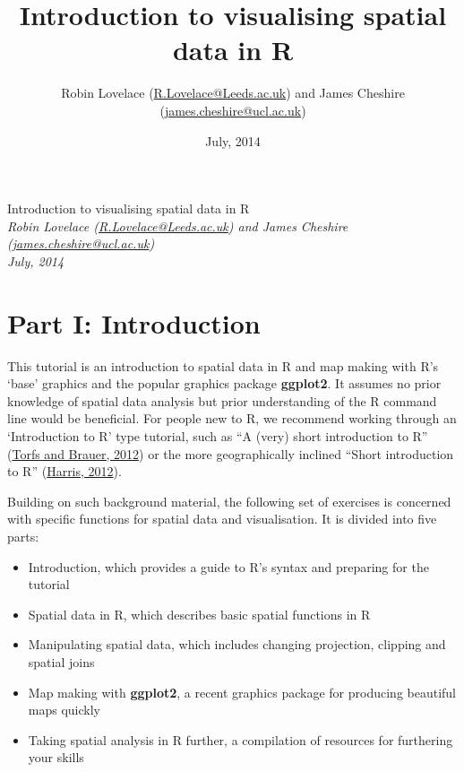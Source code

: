 \documentclass[]{article}
\title{Introduction to visualising spatial data in R}
\author{Robin Lovelace
(\href{mailto:R.Lovelace@Leeds.ac.uk}{R.Lovelace@Leeds.ac.uk}) and James
Cheshire
(\href{mailto:james.cheshire@ucl.ac.uk}{james.cheshire@ucl.ac.uk})}
\date{July, 2014}
\begin{document}
\begin{center}
\huge Introduction to visualising spatial data in R \\[0.2cm]
\large \emph{Robin Lovelace
(\href{mailto:R.Lovelace@Leeds.ac.uk}{R.Lovelace@Leeds.ac.uk}) and James
Cheshire
(\href{mailto:james.cheshire@ucl.ac.uk}{james.cheshire@ucl.ac.uk})}\\[0.1cm]
\large \emph{July, 2014} \\
\normalsize
\end{center}


{
\hypersetup{linkcolor=black}
\setcounter{tocdepth}{2}
\tableofcontents
}
\newpage

\section{Part I: Introduction}\label{part-i-introduction}

This tutorial is an introduction to spatial data in R and map making
with R's `base' graphics and the popular graphics package
\textbf{ggplot2}. It assumes no prior knowledge of spatial data analysis
but prior understanding of the R command line would be beneficial. For
people new to R, we recommend working through an `Introduction to R'
type tutorial, such as ``A (very) short introduction to R''
(\href{http://cran.r-project.org/doc/contrib/Torfs+Brauer-Short-R-Intro.pdf}{Torfs
and Brauer, 2012}) or the more geographically inclined ``Short
introduction to R''
(\href{http://www.social-statistics.org/wp-content/uploads/2012/12/intro_to_R1.pdf}{Harris,
2012}).

Building on such background material, the following set of exercises is
concerned with specific functions for spatial data and visualisation. It
is divided into five parts:

\begin{itemize}
\itemsep1pt\parskip0pt
\item
  Introduction, which provides a guide to R's syntax and preparing for
  the tutorial
\item
  Spatial data in R, which describes basic spatial functions in R
\item
  Manipulating spatial data, which includes changing projection,
  clipping and spatial joins
\item
  Map making with \textbf{ggplot2}, a recent graphics package for
  producing beautiful maps quickly
\item
  Taking spatial analysis in R further, a compilation of resources for
  furthering your skills
\end{itemize}
\end{document}
